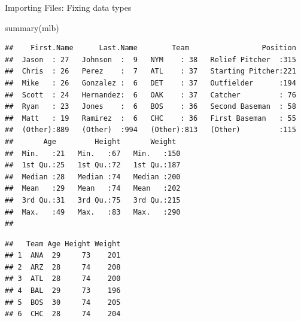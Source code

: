 \documentclass[
  9pt,
  ignorenonframetext,
]{beamer}
\newenvironment{Shaded}{\begin{snugshade}}{\end{snugshade}}
\newcommand{\DataTypeTok}[1]{\textcolor[rgb]{0.87,0.87,0.75}{#1}}
\newcommand{\KeywordTok}[1]{\textcolor[rgb]{0.94,0.87,0.69}{#1}}
\newcommand{\NormalTok}[1]{\textcolor[rgb]{0.80,0.80,0.80}{#1}}
\newcommand{\OperatorTok}[1]{\textcolor[rgb]{0.94,0.94,0.82}{#1}}
\newcommand{\StringTok}[1]{\textcolor[rgb]{0.80,0.58,0.58}{#1}}
\begin{document}
\begin{frame}[fragile]{Importing Files: Fixing data types}
\protect\hypertarget{importing-files-fixing-data-types-1}{}
\footnotesize

\begin{Shaded}
\begin{Highlighting}[]
\KeywordTok{summary}\NormalTok{(mlb)}
\end{Highlighting}
\end{Shaded}

\begin{verbatim}
##    First.Name      Last.Name        Team                 Position  
##  Jason  : 27   Johnson  :  9   NYM    : 38   Relief Pitcher  :315  
##  Chris  : 26   Perez    :  7   ATL    : 37   Starting Pitcher:221  
##  Mike   : 26   Gonzalez :  6   DET    : 37   Outfielder      :194  
##  Scott  : 24   Hernandez:  6   OAK    : 37   Catcher         : 76  
##  Ryan   : 23   Jones    :  6   BOS    : 36   Second Baseman  : 58  
##  Matt   : 19   Ramirez  :  6   CHC    : 36   First Baseman   : 55  
##  (Other):889   (Other)  :994   (Other):813   (Other)         :115  
##       Age         Height       Weight   
##  Min.   :21   Min.   :67   Min.   :150  
##  1st Qu.:25   1st Qu.:72   1st Qu.:187  
##  Median :28   Median :74   Median :200  
##  Mean   :29   Mean   :74   Mean   :202  
##  3rd Qu.:31   3rd Qu.:75   3rd Qu.:215  
##  Max.   :49   Max.   :83   Max.   :290  
## 
\end{verbatim}

\begin{Shaded}
\end{Shaded}

\begin{verbatim}
##   Team Age Height Weight
## 1  ANA  29     73    201
## 2  ARZ  28     74    208
## 3  ATL  28     74    200
## 4  BAL  29     73    196
## 5  BOS  30     74    205
## 6  CHC  28     74    204
\end{verbatim}
\end{frame}
\end{document}
